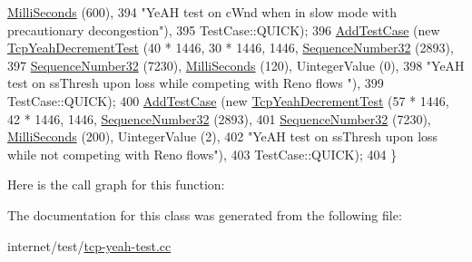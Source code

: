 \begin{DoxyCode}
      \hyperlink{group__timecivil_gaf26127cf4571146b83a92ee18679c7a9}{MilliSeconds} (600),
394                                            \textcolor{stringliteral}{"YeAH test on cWnd when in slow mode with precautionary
       decongestion"}),
395                  TestCase::QUICK);
396     \hyperlink{classns3_1_1TestCase_a3718088e3eefd5d6454569d2e0ddd835}{AddTestCase} (\textcolor{keyword}{new} \hyperlink{classTcpYeahDecrementTest}{TcpYeahDecrementTest} (40 * 1446, 30 * 1446, 1446, 
      \hyperlink{classns3_1_1SequenceNumber}{SequenceNumber32} (2893),
397                                            \hyperlink{classns3_1_1SequenceNumber}{SequenceNumber32} (7230), 
      \hyperlink{group__timecivil_gaf26127cf4571146b83a92ee18679c7a9}{MilliSeconds} (120), UintegerValue (0),
398                                            \textcolor{stringliteral}{"YeAH test on ssThresh upon loss while competing with Reno flows
      "}),
399                  TestCase::QUICK);
400     \hyperlink{classns3_1_1TestCase_a3718088e3eefd5d6454569d2e0ddd835}{AddTestCase} (\textcolor{keyword}{new} \hyperlink{classTcpYeahDecrementTest}{TcpYeahDecrementTest} (57 * 1446, 42 * 1446, 1446, 
      \hyperlink{classns3_1_1SequenceNumber}{SequenceNumber32} (2893),
401                                            \hyperlink{classns3_1_1SequenceNumber}{SequenceNumber32} (7230), 
      \hyperlink{group__timecivil_gaf26127cf4571146b83a92ee18679c7a9}{MilliSeconds} (200), UintegerValue (2),
402                                            \textcolor{stringliteral}{"YeAH test on ssThresh upon loss while not competing with Reno
       flows"}),
403                  TestCase::QUICK);
404   \}
\end{DoxyCode}


Here is the call graph for this function\+:




The documentation for this class was generated from the following file\+:\begin{DoxyCompactItemize}
\item 
internet/test/\hyperlink{tcp-yeah-test_8cc}{tcp-\/yeah-\/test.\+cc}\end{DoxyCompactItemize}
